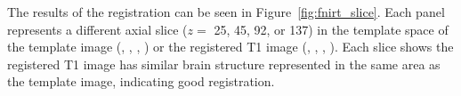 \gobblepars

 
The results of the registration can be seen in Figure~\ref{fig:fnirt_slice}.  Each panel represents a different axial slice ($z =$ 25, 45, 92, or 137) in the template space of the template image (\protect{}, \protect{}, \protect{}, \protect{}) or the registered T1 image (\protect{}, \protect{}, \protect{}, \protect{}).  Each slice shows the registered T1 image has similar brain structure represented in the same area as the template image, indicating good registration.





